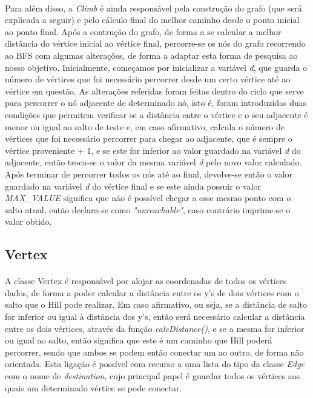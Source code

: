 \documentclass[12pt]{article}
\begin{document}
\paragraph{}
Para além disso, a \textit{Climb} é ainda responsável pela construção do grafo (que será explicada a seguir) e pelo cálculo final do melhor caminho desde o ponto inicial ao ponto final. Após a contrução do grafo, de forma a se calcular a melhor distância do vértice inicial ao vértice final, percorre-se os nós do grafo recorrendo ao BFS com algumas alterações, de forma a adaptar esta forma de pesquisa ao nosso objetivo. Inicialmente, começamos por inicializar a variável \textit{d}, que guarda o número de vértices que foi necessário percorrer desde um certo vértice até ao vértice em questão. As alterações referidas foram feitas dentro do ciclo que serve para percorrer o nó adjacente de determinado nó, isto é, foram introduzidas duas condições que permitem verificar se a distância entre o vértice e o seu adjacente é menor ou igual ao salto de teste e, em caso afirmativo, calcula o número de vértices que foi necessário percorrer para chegar ao adjacente, que é sempre o vértice proveniente + 1, e se este for inferior ao valor guardado na variável \textit{d} do adjacente, então troca-se o valor da mesma variável \textit{d} pelo novo valor calculado. Após terminar de percorrer todos os nós até ao final, devolve-se então o valor guardado na variável \textit{d} do vértice final e se este ainda possuir o valor \textit{MAX\_VALUE} significa que não é possível chegar a esse mesmo ponto com o salto atual, então declara-se como \textit{"unreachable"}, caso contrário imprime-se o valor obtido.
\subsection{Vertex}
\paragraph{}
A classe Vertex é responsável por alojar as coordenadas de todos os vértices dados, de forma a poder calcular a distância entre os y's de dois vértices com o salto que o Hill pode realizar. Em caso afirmativo, ou seja, se a distância de salto for inferior ou igual à distância dos y's, então será necessário calcular a distância entre os dois vértices, através da função \textit{calcDistance()}, e se a mesma for inferior ou igual ao salto, então significa que este é um caminho que Hill poderá percorrer, sendo que ambos se podem então conectar um ao outro, de forma não orientada. Esta ligação é possível com recurso a uma lista do tipo da classe \textit{Edge} com o nome de \textit{destination}, cujo principal papel é guardar todos os vértices aos quais um determinado vértice se pode conectar.
\end{document}
